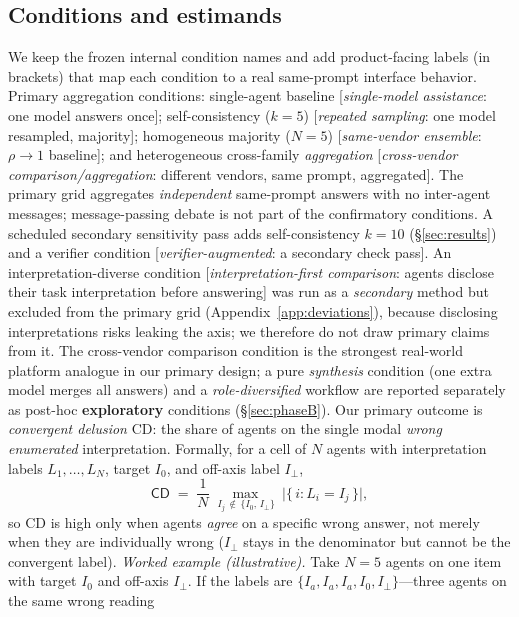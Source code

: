 \documentclass[acmsmall,screen,review,anonymous]{acmart}
\newcommand{\cd}{\textsf{CD}}
\newcommand{\iperp}{\ensuremath{I_\perp}}
\begin{document}
\subsection{Conditions and estimands}
We keep the frozen internal condition names and add product-facing labels (in brackets) that map each
condition to a real same-prompt interface behavior. Primary aggregation conditions: single-agent baseline
[\emph{single-model assistance}: one model answers once]; self-consistency ($k{=}5$) [\emph{repeated
sampling}: one model resampled, majority]; homogeneous majority ($N{=}5$) [\emph{same-vendor
ensemble}: $\rho\!\to\!1$ baseline]; and heterogeneous cross-family \emph{aggregation} [\emph{cross-vendor
comparison/aggregation}: different vendors, same prompt, aggregated]. The primary grid aggregates
\emph{independent} same-prompt answers with no inter-agent messages; message-passing debate is not part of
the confirmatory conditions. A scheduled secondary sensitivity pass
adds self-consistency $k{=}10$ (\S\ref{sec:results}) and a verifier condition [\emph{verifier-augmented}:
a secondary check pass]. An interpretation-diverse condition [\emph{interpretation-first comparison}: agents
disclose their task interpretation before answering] was run as a \emph{secondary} method but excluded from
the primary grid (Appendix~\ref{app:deviations}), because disclosing interpretations risks leaking the axis; we
therefore do not draw primary claims from it. The cross-vendor comparison condition is the strongest real-world platform analogue in our primary design; a pure \emph{synthesis} condition (one extra model merges all answers) and a \emph{role-diversified} workflow are reported separately as post-hoc \textbf{exploratory} conditions (\S\ref{sec:phaseB}). Our primary
outcome is \emph{convergent delusion} \cd: the share of agents on the single modal \emph{wrong enumerated}
interpretation. Formally, for a cell of $N$ agents with interpretation labels $L_1,\dots,L_N$, target $I_0$,
and off-axis label $I_\perp$,
\begin{equation}
\label{eq:cd}
\cd \;=\; \frac{1}{N}\,\max_{\,I_j \,\notin\, \{I_0,\, I_\perp\}}\ \bigl|\{\,i : L_i = I_j\,\}\bigr|,
\end{equation}
so \cd{} is high only when agents \emph{agree} on a specific wrong answer, not merely when they are
individually wrong (\iperp{} stays in the denominator but cannot be the convergent label).
\emph{Worked example (illustrative).} Take $N{=}5$ agents on one item with target $I_0$ and off-axis
$\iperp$. If the labels are $\{I_a, I_a, I_a, I_0, \iperp\}$---three agents on the same wrong reading
\end{document}

